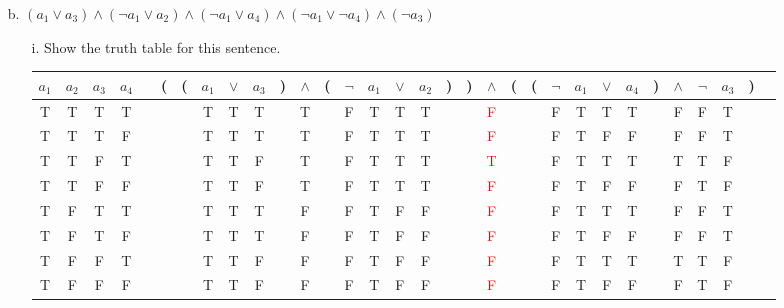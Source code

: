 \documentclass[11pt]{article}
\begin{document}
\begin{flushleft}
\begin{enumerate}
\begin{enumerate}
            \end{enumerate}
        \item[b.] $(a_1 \lor a_3) \land (\neg a_1 \lor a_2) \land (\neg a_1 \lor a_4) \land (\neg a_1 \lor \neg a_4) \land (\neg a_3)$

            \begin{enumerate} 
                \item[i.] Show the truth table for this sentence. \par
                    \medskip
                    \begin{tabular}{@{ }c@{ }@{ }c@{ }@{ }c@{ }@{ }c | c@{ }@{}c@{}@{}c@{}@{ }c@{ }@{ }c@{ }@{ }c@{ }@{}c@{}@{ }c@{ }@{}c@{}@{ }c@{ }@{ }c@{ }@{ }c@{ }@{ }c@{ }@{}c@{}@{}c@{}@{ }c@{ }@{}c@{}@{}c@{}@{ }c@{ }@{ }c@{ }@{ }c@{ }@{ }c@{ }@{}c@{}@{ }c@{ }@{ }c@{ }@{ }c@{ }@{}c@{}@{ }c}
                    $a_1$ & $a_2$ & $a_3$ & $a_4$ &  & ( & ( & $a_1$ & $\lor$ & $a_3$ & ) & $\land$ & ( & $\lnot$ & $a_1$ & $\lor$ & $a_2$ & ) & ) & $\land$ & ( & ( & $\lnot$ & $a_1$ & $\lor$ & $a_4$ & ) & $\land$ & $\lnot$ & $a_3$ & ) & \\
                    \hline 
                    T & T & T & T &  &  &  & T & T & T &  & T &  & F & T & T & T &  &  & \textcolor{red}{F} &  &  & F & T & T & T &  & F & F & T &  & \\
                    T & T & T & F &  &  &  & T & T & T &  & T &  & F & T & T & T &  &  & \textcolor{red}{F} &  &  & F & T & F & F &  & F & F & T &  & \\
                    T & T & F & T &  &  &  & T & T & F &  & T &  & F & T & T & T &  &  & \textcolor{red}{T} &  &  & F & T & T & T &  & T & T & F &  & \\
                    T & T & F & F &  &  &  & T & T & F &  & T &  & F & T & T & T &  &  & \textcolor{red}{F} &  &  & F & T & F & F &  & F & T & F &  & \\
                    T & F & T & T &  &  &  & T & T & T &  & F &  & F & T & F & F &  &  & \textcolor{red}{F} &  &  & F & T & T & T &  & F & F & T &  & \\
                    T & F & T & F &  &  &  & T & T & T &  & F &  & F & T & F & F &  &  & \textcolor{red}{F} &  &  & F & T & F & F &  & F & F & T &  & \\
                    T & F & F & T &  &  &  & T & T & F &  & F &  & F & T & F & F &  &  & \textcolor{red}{F} &  &  & F & T & T & T &  & T & T & F &  & \\
                    T & F & F & F &  &  &  & T & T & F &  & F &  & F & T & F & F &  &  & \textcolor{red}{F} &  &  & F & T & F & F &  & F & T & F &  & \\

\end{tabular}
\end{enumerate}
\end{enumerate}
\end{flushleft}
\end{document}
